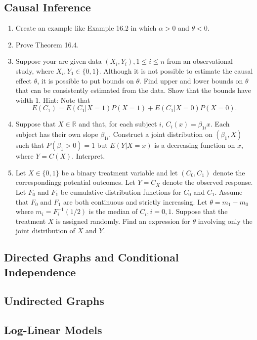 \documentclass{article}
\begin{document}
\subsection{Causal Inference}
\begin{enumerate}
	\item Create an example like Example 16.2 in which $\alpha > 0$ and $\theta < 0$.
	\item Prove Theorem 16.4.
	\item Suppose your are given data $(X_i, Y_i), 1 \leq i \leq n$ from an observational study, where $X_i, Y_1 \in \{0, 1\}$. Although it is not possible to estimate the causal effect $\theta$, it is possible to put bounds on $\theta$. Find upper and lower bounds on $\theta$ that can be consistently estimated from the data. Show that the bounds have width $1$.
	Hint: Note that
	$$
	E(C_1) = E(C_1|X = 1)P(X = 1) + E(C_1|X = 0)P(X = 0).
	$$
	\item Suppose that $X \in \mathbb{R}$ and that, for each subject $i$, $C_i(x) = \beta_{1i}x$. Each subject has their own slope $\beta_{1i}$. Construct a joint distribution on $(\beta_1, X)$ such that $P(\beta_1 > 0) = 1$ but $E(Y|X = x)$ is a decreasing function on $x$, where  $Y = C(X)$. Interpret.
	\item Let $X \in \{0, 1\}$ be a binary treatment variable and let $(C_0, C_1)$ denote the correspondingg potential outcomes. Let $Y = C_X$ denote the observed response. Let $F_0$ and $F_1$ be cumulative distribution functions for $C_0$ and $C_1$. Assume that $F_0$ and $F_1$ are both continuous and strictly increasing. Let $\theta = m_1 - m_0$ where $m_i = F_i^{-1}(1 / 2)$ is the median of $C_i, i = 0, 1$. Suppose that the treatment $X$ is assigned randomly. Find an expression for $\theta$ involving only the joint distribution of $X$ and $Y$.
\end{enumerate}

\subsection{Directed Graphs and Conditional Independence}

\subsection{Undirected Graphs}

\subsection{Log-Linear Models}
\end{document}
